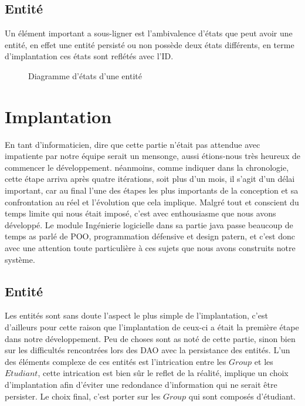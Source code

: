 \documentclass[a4paper,french,final]{memoir}
\begin{document}
\section{Entité}
Un élément important a sous-ligner est l'ambivalence d'états que peut avoir une entité, en effet une entité persisté ou non possède deux états
différents, en terme d'implantation ces états sont reflétés avec l'ID.
\begin{figure}[ht]
    \centering
    
    \caption[Diagramme d'états]{Diagramme d'états d'une entité}
    \label{fig:diagseq}
\end{figure}


\chapter{Implantation}\label{chap:implantation}

En tant d'informaticien, dire que cette partie n'était pas attendue avec impatiente par notre équipe serait un mensonge, aussi étions-nous très heureux de commencer le développement. néanmoins, comme indiquer dans la chronologie, cette étape arriva après quatre itérations, soit plus d'un mois, il s'agit d'un délai important, car au final l'une des étapes les plus importants de la conception et sa confrontation au réel et l'évolution que cela implique. Malgré tout et conscient du temps limite qui nous était imposé, c'est avec enthousiasme que nous avons développé.
Le module Ingénierie logicielle dans sa partie java passe beaucoup de temps as parlé de POO, programmation défensive et design patern, et c'est donc avec une attention toute particulière à ces sujets que nous avons construits notre système.

\section{Entité}
Les entités sont sans doute l'aspect le plus simple de l'implantation, c'est d'ailleurs pour cette raison que l'implantation de ceux-ci a était la première étape dans notre développement. Peu de choses sont as noté de cette partie, sinon bien sur les difficultés rencontrées lors des DAO avec la persistance des entités. L'un des éléments complexe de ces entités est l'intrication entre les $Group$ et les $Etudiant$, cette intrication est bien sûr le reflet de la réalité, implique un choix d'implantation afin d'éviter une redondance d'information qui ne serait
être persister. Le choix final, c'est porter sur les $Group$ qui sont composés d'étudiant.
\end{document}
